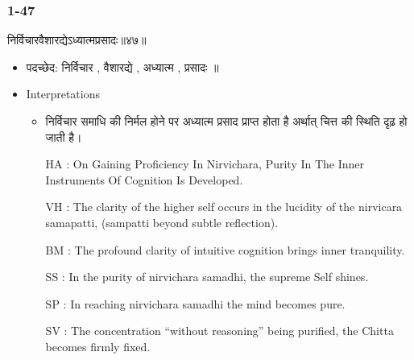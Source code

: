 \begin{frame}[fragile]\frametitle{1-47}
\begin{sanskrit}
निर्विचारवैशारद्येऽध्यात्मप्रसादः॥४७॥
\end{sanskrit}

	\begin{itemize}
	\item पदच्छेद: निर्विचार , वैशारद्ये , अध्यात्म , प्रसादः ॥
	\item Interpretations
		\begin{itemize}
		\item निर्विचार समाधि की निर्मल होने पर अध्यात्म प्रसाद प्राप्त होता है अर्थात् चित्त की स्थिति दृढ़ हो जाती है।
		\item [HA]: On Gaining Proficiency In Nirvichara, Purity In The Inner Instruments Of Cognition Is Developed.
		\item [VH]: The clarity of the higher self occurs in the lucidity of the nirvicara samapatti, (sampatti beyond subtle reflection).
		\item [BM]: The profound clarity of intuitive cognition brings inner tranquility.
		\item [SS]: In the purity of nirvichara samadhi, the supreme Self shines.
		\item [SP]: In reaching nirvichara samadhi the mind becomes pure.
		\item [SV]: The concentration “without reasoning” being purified, the Chitta becomes firmly fixed.
		\end{itemize}
	\end{itemize}
	
\end{frame}





